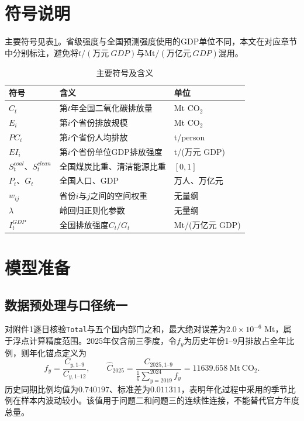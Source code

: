 \documentclass[12pt,a4paper]{ctexart}
\theoremstyle{definition}
\theoremstyle{plain}
\theoremstyle{remark}
\begin{document}
\section{符号说明}
主要符号见表\ref{tab:symbol}。省级强度与全国预测强度使用的GDP单位不同，本文在对应章节中分别标注，避免将$t/(万元\ GDP)$与$\mathrm{Mt}/(万亿元\ GDP)$混用。

\begin{table}[H]
\centering
\caption{主要符号及含义}
\label{tab:symbol}
\begin{tabular}{>{\centering\arraybackslash}p{2.7cm}>{\raggedright\arraybackslash}p{7.2cm}>{\centering\arraybackslash}p{2.0cm}}
\toprule
符号 & 含义 & 单位\\
\midrule
$C_t$ & 第$t$年全国二氧化碳排放量 & Mt CO$_2$\\
$E_i$ & 第$i$个省份排放规模 & Mt CO$_2$\\
$PC_i$ & 第$i$个省份人均排放 & t/person\\
$EI_i$ & 第$i$个省份单位GDP排放强度 & t/(万元 GDP)\\
$S_t^{coal}$、$S_t^{clean}$ & 全国煤炭比重、清洁能源比重 & $[0,1]$\\
$P_t$、$G_t$ & 全国人口、GDP & 万人、万亿元\\
$w_{ij}$ & 省份$i$与$j$之间的空间权重 & 无量纲\\
$\lambda$ & 岭回归正则化参数 & 无量纲\\
$I_t^{GDP}$ & 全国排放强度$C_t/G_t$ & Mt/(万亿元 GDP)\\
\bottomrule
\end{tabular}
\end{table}

\section{模型准备}

\subsection{数据预处理与口径统一}
对附件1逐日核验\texttt{Total}与五个国内部门之和，最大绝对误差为$2.0\times10^{-6}$ Mt，属于浮点计算精度范围。2025年仅含前三季度，令$f_y$为历史年份1--9月排放占全年比例，则年化锚点定义为
\begin{equation}
f_y=\frac{C_{y,1\text{--}9}}{C_{y,1\text{--}12}},\qquad
\widehat C_{2025}=\frac{C_{2025,1\text{--}9}}{\frac{1}{6}\sum_{y=2019}^{2024}f_y}=11639.658\ \mathrm{Mt\ CO_2}.
\label{eq:annualize}
\end{equation}
历史同期比例均值为$0.740197$、标准差为$0.011311$，表明年化过程中采用的季节比例在样本内波动较小。该值用于问题二和问题三的连续性连接，不能替代官方年度总量。
\end{document}
